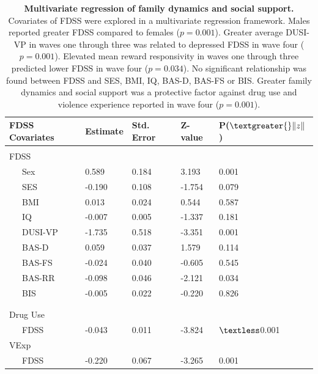 \documentclass[utf8]{article}
\begin{document}
\begin{table}[h!]
\begin{tabular}{lllll}
FDSS Covariates & Estimate & Std. Error & Z-value & P($\textgreater{}\|z\|$) \\ \hline
           &          &            &         &                          \\
FDSS       &          &            &         &                          \\
\ \ \ Sex        & 0.589    & 0.184      & 3.193   & 0.001                    \\
\ \ \ SES        & -0.190   & 0.108      & -1.754  & 0.079                    \\
\ \ \ BMI        & 0.013    & 0.024      & 0.544   & 0.587                    \\
\ \ \ IQ         & -0.007   & 0.005      & -1.337  & 0.181                    \\
\ \ \ DUSI-VP    & -1.735   & 0.518      & -3.351  & 0.001                    \\
\ \ \ BAS-D      & 0.059    & 0.037      & 1.579   & 0.114                    \\
\ \ \ BAS-FS     & -0.024   & 0.040      & -0.605  & 0.545                    \\
\ \ \ BAS-RR     & -0.098   & 0.046      & -2.121  & 0.034                    \\
\ \ \ BIS        & -0.005   & 0.022      & -0.220  & 0.826                    \\
           &          &            &         &                          \\ \hline \\
Drug Use       &          &            &         &                          \\
\ \ \ FDSS       & -0.043   & 0.011      & -3.824  & $\textless$0.001 \\
VExp       &          &            &         &                          \\
\ \ \ FDSS       & -0.220   & 0.067      & -3.265  & 0.001                   
\end{tabular}
\caption{\textbf{Multivariate regression of family dynamics and social support.} Covariates of FDSS were explored in a multivariate regression framework. Males reported greater FDSS compared to females ($p=0.001$). Greater average DUSI-VP in waves one through three was related to depressed FDSS in wave four ($p=0.001$). Elevated mean reward responsivity in waves one through three predicted lower FDSS in wave four ($p=0.034$). No significant relationship was found between FDSS and SES, BMI, IQ, BAS-D, BAS-FS or BIS. Greater family dynamics and social support was a protective factor against drug use and violence experience reported in wave four ($p=0.001$). \label{tab:6}}
\end{table}
\end{document}
